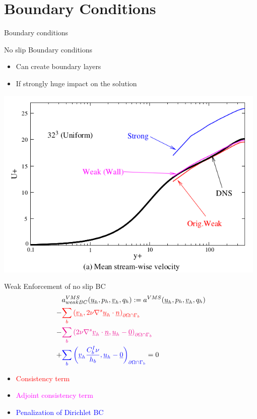 \documentclass[9pt,compress,t,aspectratio=169]{beamer}
\newcommand{\scprb}[2]{\sum_b \left(#1,#2\right)_{\partial\Omega \cap \Gamma_b }}
\newcommand{\red}[1]{\textcolor{red}{#1}}
\newcommand{\blue}[1]{\textcolor{blue}{#1}}
\newcommand{\magenta}[1]{\textcolor{magenta}{#1}}
\newcommand{\ww}[1]{\underline{#1}}
\newcommand{\1}{\begin{pmatrix}
		1\\
		1
\end{pmatrix}}
\renewcommand{\vec}[1]{\ww{#1}}
\begin{document}
\section{Boundary Conditions}
\begin{frame}{Boundary conditions}
	 \begin{minipage}{0.49\textwidth}
	 	\begin{block}{No slip Boundary conditions}
	 		\begin{itemize}
	 			\item Can create boundary layers
	 			\item If strongly huge impact on the solution
	 		\end{itemize}
 		\includegraphics[width=0.98\textwidth]{figures/hughes_example.png}
	 	\end{block}
	 \end{minipage}\hfill
	 \begin{minipage}{0.49\textwidth}
	 \begin{block}{Weak Enforcement of no slip BC}
	 	\begin{align*}
	 		&a^{VMS}_{weakBC}(\vec{u}_h,p_h,\vec{v}_h,q_h):=a^{VMS}(\vec{u}_h,p_h,\vec{v}_h,q_h)\\
			-&\red{\scprb{\vec{v}_h}{2\nu \nabla^s \vec{u}_h \cdot \vec{n}}}\\
			-&\magenta{\scprb{2\nu \nabla^s \vec{v}_h \cdot \vec{n}}{\vec{u}_h-\vec{0}}}\\
			+&\blue{\scprb{\vec{v}_h \frac{C_b^I \nu}{h_b}}{\vec{u}_h-\vec{0}}}=0			
	 	\end{align*}
 	\begin{itemize}
 		\item \red{Consistency term}
 		\item \magenta{Adjoint consistency term}
 		\item \blue{Penalization of Dirichlet BC }
 	\end{itemize}
	 \end{block}
\end{minipage}

\end{frame}
\end{document}

